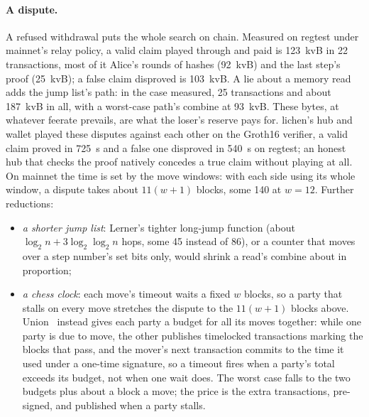\documentclass[11pt]{article}
\begin{document}
\paragraph{A dispute.} A refused withdrawal puts the whole search on
chain. Measured on regtest under mainnet's relay policy, a valid claim
played through and paid is 123~kvB in 22 transactions, most of it
Alice's rounds of hashes (92~kvB) and the last step's proof (25~kvB); a
false claim disproved is 103~kvB. A lie about a memory read adds the
jump list's path: in the case measured, 25 transactions and about
187~kvB in all, with a worst-case path's combine at 93~kvB. These
bytes, at whatever feerate prevails, are what the loser's reserve pays
for. lichen's hub and wallet played these disputes against each other
on the Groth16 verifier, a valid claim proved in 725~s and a false one
disproved in 540~s on regtest; an honest hub that checks the proof
natively concedes a true claim without playing at all. On mainnet the
time is set by the move windows: with each side using its whole window,
a dispute takes about $11(w+1)$ blocks, some 140 at $w = 12$.
Further reductions:
\begin{itemize}[leftmargin=1.5em]
\item \emph{a shorter jump list}: Lerner's tighter long-jump function
  (about $\log_2 n + 3\log_2\log_2 n$ hops, some 45 instead of 86), or a
  counter that moves over a step number's set bits only, would shrink a
  read's combine about in proportion;
\item \emph{a chess clock}: each move's timeout waits a fixed $w$
  blocks, so a party that stalls on every move stretches the dispute to
  the $11(w+1)$ blocks above. Union~\cite{union} instead gives each
  party a budget for all its moves together: while one party is due to
  move, the other publishes timelocked transactions marking the blocks
  that pass, and the mover's next transaction commits to the time it
  used under a one-time signature, so a timeout fires when a party's
  total exceeds its budget, not when one wait does. The worst case falls
  to the two budgets plus about a block a move; the price is the extra
  transactions, pre-signed, and published when a party stalls.
\end{itemize}
\end{document}
